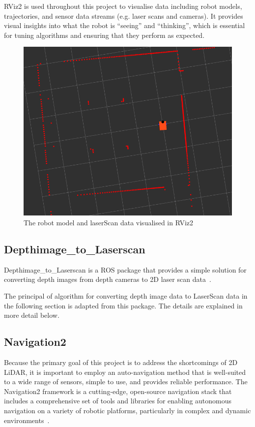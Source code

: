 RViz2 is used throughout this project to visualise data including robot models, 
trajectories, and sensor data streams (e.g. laser scans and cameras). 
It provides visual insights into what the robot is ``seeing'' and ``thinking'', 
which is essential for tuning algorithms and ensuring that they perform as expected.
\begin{figure}[H]
    \centering
    \includegraphics[width=0.8\linewidth]{figs/robotandlaser.png}
    \caption{The robot model and laserScan data visualised in RViz2}
\end{figure}
\subsection{Depthimage\_to\_Laserscan}
Depthimage\_to\_Laserscan is a ROS package that provides a simple solution for converting depth images from depth cameras to 2D laser scan data~\cite{rosdepthimage}. 

The principal of algorithm for converting depth image data to LaserScan data in the following section is adapted from this package. 
The details are explained in more detail below.

\subsection{Navigation2}
Because the primary goal of this project is to address the shortcomings of 2D LiDAR, 
it is important to employ an auto-navigation method that is well-suited to a wide range of sensors, 
simple to use, and provides reliable performance.
The Navigation2 framework is a cutting-edge, 
open-source navigation stack that includes a comprehensive set of tools and libraries 
for enabling autonomous navigation on a variety of robotic platforms, particularly in complex and dynamic environments~\cite{nav2}. 

